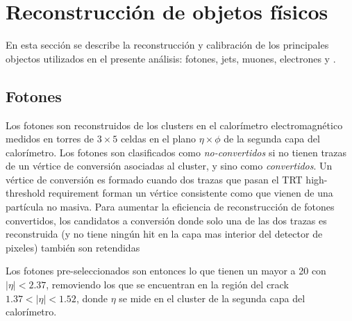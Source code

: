 \chapter{Reconstrucción de objetos físicos} %
\label{sec:obj_selection}


En esta sección se describe la reconstrucción y calibración de los
principales objectos utilizados en el presente an\'alisis:
fotones, jets, muones, electrones y \met.



\section{Fotones}
\label{sec:obj_photons}

Los fotones son reconstruidos de los clusters en el calorímetro electromagnético
medidos en torres de $3\times5$ celdas en el plano $\eta\times\phi$ de la
segunda capa del calorímetro. Los fotones son clasificados como
\emph{no-convertidos} si no tienen trazas de un vértice de conversión asociadas
al cluster, y sino como \emph{convertidos}. Un vértice de conversión es formado
cuando dos trazas que pasan el TRT high-threshold requirement forman un vértice
consistente como que vienen de una partícula no masiva. Para aumentar la
eficiencia de reconstrucción de fotones convertidos, los candidatos a conversión
donde solo una de las dos trazas es reconstruida (y no tiene ningún hit en la
capa mas interior del detector de pixeles) también son retendidas

Los fotones pre-seleccionados son entonces lo que tienen un {\pt} mayor a 20
{\gev} con $|\eta| < 2.37$, removiendo los que se encuentran en la región del
crack $1.37 < |\eta| < 1.52$, donde $\eta$ se mide en el cluster de la segunda
capa del calorímetro.

